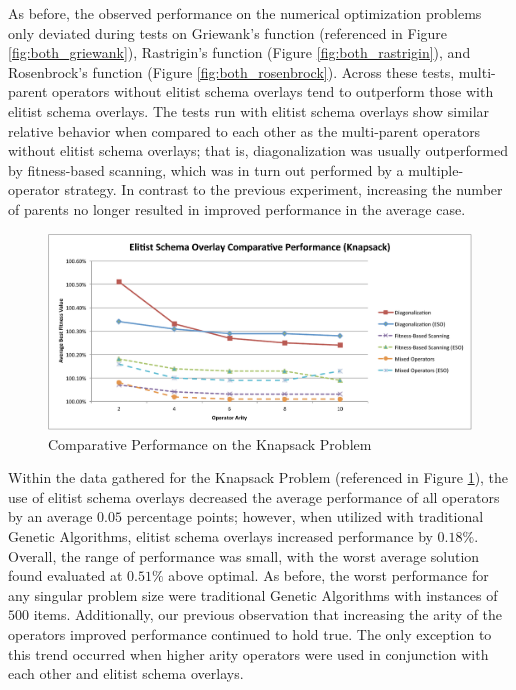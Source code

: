 As before, the observed performance on the numerical optimization problems only deviated during tests on Griewank's function (referenced in Figure \ref{fig:both_griewank}), Rastrigin's function (Figure \ref{fig:both_rastrigin}), and Rosenbrock's function (Figure \ref{fig:both_rosenbrock}). Across these tests, multi-parent operators without elitist schema overlays tend to outperform those with elitist schema overlays. The tests run with elitist schema overlays show similar relative behavior when compared to each other as the multi-parent operators without elitist schema overlays; that is, diagonalization was usually outperformed by fitness-based scanning, which was in turn out performed by a multiple-operator strategy. In contrast to the previous experiment, increasing the number of parents no longer resulted in improved performance in the average case.

\begin{figure}[htbp!]
\centering
\includegraphics[scale=0.55]{charts/Both_Knapsack.pdf}
\caption{Comparative Performance on the Knapsack Problem}
\label{fig:both_knapsack}
\end{figure}

Within the data gathered for the Knapsack Problem (referenced in Figure \ref{fig:both_knapsack}), the use of elitist schema overlays decreased the average performance of all operators by an average $0.05$ percentage points; however, when utilized with traditional Genetic Algorithms, elitist schema overlays increased performance by $0.18\%$. Overall, the range of performance was small, with the worst average solution found evaluated at $0.51\%$ above optimal. As before, the worst performance for any singular problem size were traditional Genetic Algorithms with instances of $500$ items. Additionally, our previous observation that increasing the arity of the operators improved performance continued to hold true. The only exception to this trend occurred when higher arity operators were used in conjunction with each other and elitist schema overlays.

